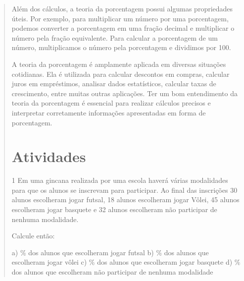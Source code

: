 \begin{quote}
\begin{escolha}
{Além dos cálculos, a teoria da porcentagem possui algumas propriedades úteis. Por exemplo, para multiplicar 
um número por uma porcentagem, podemos converter a porcentagem em uma fração decimal e multiplicar o número 
pela fração equivalente. Para calcular a porcentagem de um número, multiplicamos o número pela porcentagem e 
dividimos por 100.

A teoria da porcentagem é amplamente aplicada em diversas situações cotidianas. Ela é utilizada para calcular 
descontos em compras, calcular juros em empréstimos, analisar dados estatísticos, calcular taxas de 
crescimento, entre muitas outras aplicações. Ter um bom entendimento da teoria da porcentagem é essencial 
para realizar cálculos precisos e interpretar corretamente informações apresentadas em forma de porcentagem.}

\section{Atividades}

\num{1} Em uma gincana realizada por uma escola haverá várias modalidades
para que os alunos se inscrevam para participar. Ao final das inscrições
30 alunos escolheram jogar futsal, 18 alunos escolheram jogar Vôlei, 45
alunos escolheram jogar basquete e 32 alunos escolheram não participar
de nenhuma modalidade.

Calcule então:

a) \% dos alunos que escolheram jogar futsal
b) \% dos alunos que escolheram jogar vôlei
c) \% dos alunos que escolheram jogar basquete
d) \% dos alunos que escolheram não participar de nenhuma modalidade


\end{escolha}
\end{quote}

